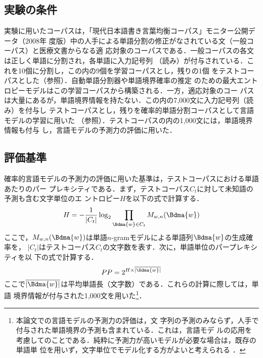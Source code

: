 \documentclass[japanese]{jnlp_1.4}
\begin{document}
\subsection{実験の条件}

実験に用いたコーパスは，「現代日本語書き言葉均衡コーパス」モニター公開データ（2008年
度版）中の人手による単語分割の修正がなされている文（一般コーパス）と医療文書からなる適
応対象のコーパスである．一般コーパスの各文は正しく単語に分割され，各単語に入力記号列
（読み）が付与されている．これを10個に分割し，この内の9個を学習コーパスとし，残りの1個
をテストコーパスとした（参照）．自動単語分割器や単語境界確率の推定
のための最大エントロピーモデルはこの学習コーパスから構築される．一方，適応対象のコー
パスは大量にあるが，単語境界情報を持たない．この内の7,000文に入力記号列（読み）を付与し
テストコーパスとし，残りを確率的単語分割コーパスとして言語モデルの学習に用いた
（参照）．テストコーパスの内の1,000文には，単語境界情報も付与
し，言語モデルの予測力の評価に用いた．



\subsection{評価基準}

確率的言語モデルの予測力の評価に用いた基準は，テストコーパスにおける単語あたりのパー
プレキシティである．まず，テストコーパス$C_{t}$に対して未知語の予測も含む文字単位のエ
ントロピー$H$を以下の式で計算する\cite{日本語の情報量の上限の推定}．
\begin{displaymath}
  H = -\frac{1}{|C_{t}|}\log_{2} \prod_{\Bdma{w} \in C_{t}}M_{w,n}(\Bdma{w})
\end{displaymath}
ここで，$M_{w,n}(\Bdma{w})$は単語$n$-gramモデルによる単語列$\Bdma{w}$の生成確率を，
$|C_{t}|$はテストコーパス$C_{t}$の文字数を表す．次に，単語単位のパープレキシティを以
下の式で計算する．
\begin{displaymath}
  PP = 2^{H\times\overline{|\Bdma{w}|}}
\end{displaymath}
ここで$\overline{|\Bdma{w}|}$は平均単語長（文字数）である．これらの計算に際しては，単語
境界情報が付与された1,000文を用いた\footnote{本論文での言語モデルの予測力の評価は，文
字列の予測のみならず，人手で付与された単語境界の予測も含まれている．これは，言語モデ
ルの応用を考慮してのことである．純粋に予測力が高いモデルが必要な場合は，既存の単語単
位を用いず，文字単位でモデル化する方がよいと考えられる
\cite{予測単位の変更によるn-gramモデルの改善,ベイズ階層言語モデルによる教師なし形態素解析}．}．
\end{document}
